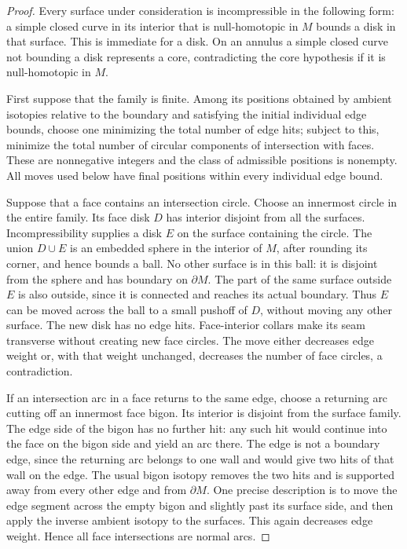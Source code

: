 \documentclass[11pt]{article}
\numberwithin{equation}{section}
\theoremstyle{definition}
\theoremstyle{remark}
\begin{document}
\begin{proof}
Every surface under consideration is incompressible in the following form:
a simple closed curve in its interior that is null-homotopic in $M$ bounds a
disk in that surface.  This is immediate for a disk.  On an annulus a simple
closed curve not bounding a disk represents a core, contradicting the core
hypothesis if it is null-homotopic in $M$.

First suppose that the family is finite.  Among its positions obtained by
ambient isotopies relative to the boundary and satisfying the initial
individual edge bounds, choose one minimizing the total number of edge hits;
subject to this, minimize the total number of circular components of
intersection with faces.  These are nonnegative integers and the class of
admissible positions is nonempty.  All moves used below have final positions
within every individual edge bound.

Suppose that a face contains an intersection circle.  Choose an innermost
circle in the entire family.  Its face disk $D$ has interior disjoint from all
the surfaces.  Incompressibility supplies a disk $E$ on the surface containing
the circle.  The union $D\cup E$ is an embedded sphere in the interior of $M$,
after rounding its corner, and hence bounds a ball.  No other surface is in
this ball: it is disjoint from the sphere and has boundary on $\partial M$.
The part of the same surface outside $E$ is also outside, since it is connected
and reaches its actual boundary.  Thus $E$ can be moved across the ball to a
small pushoff of $D$, without moving any other surface.  The new disk has no
edge hits.  Face-interior collars make its seam transverse without creating
new face circles.  The move either decreases edge weight or, with that weight
unchanged, decreases the number of face circles, a contradiction.

If an intersection arc in a face returns to the same edge, choose a returning
arc cutting off an innermost face bigon.  Its interior is disjoint from the
surface family.  The edge side of the bigon has no further hit: any such hit
would continue into the face on the bigon side and yield an arc there.  The
edge is not a boundary edge, since the returning arc belongs to one wall and
would give two hits of that wall on the edge.  The usual bigon isotopy removes
the two hits and is supported away from every other edge and from
$\partial M$.  One precise description is to move the edge segment across
the empty bigon and slightly past its surface side, and then apply the inverse
ambient isotopy to the surfaces.  This again decreases edge weight.  Hence
all face intersections are normal arcs.


\end{proof}
\end{document}
